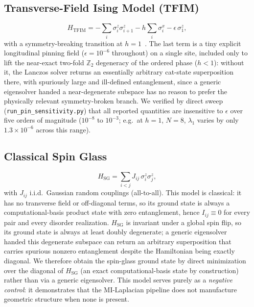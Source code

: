 \documentclass[aps,prx,reprint,amsmath,amssymb,superscriptaddress]{revtex4-2}
\begin{document}
\subsection{Transverse-Field Ising Model (TFIM)}
\begin{equation}
H_{\mathrm{TFIM}} = -\sum_{i} \sigma_i^z \sigma_{i+1}^z - h \sum_{i} \sigma_i^x - \epsilon\, \sigma_1^z,
\end{equation}
with a symmetry-breaking transition at $h=1$~\cite{Pfeuty1970}. The last term is a tiny explicit longitudinal pinning
field ($\epsilon=10^{-6}$ throughout) on a single site, included only to lift the near-exact
two-fold $\mathbb{Z}_2$ degeneracy of the ordered phase ($h<1$): without it, the Lanczos solver
returns an essentially arbitrary cat-state superposition there, with spuriously large and
ill-defined entanglement, since a generic eigensolver handed a near-degenerate subspace has no
reason to prefer the physically relevant symmetry-broken branch. We verified by direct sweep
(\texttt{run\_pin\_sensitivity.py}) that all reported quantities are insensitive to $\epsilon$ over
five orders of magnitude ($10^{-8}$ to $10^{-3}$; e.g.\ at $h=1$, $N=8$, $\lambda_1$ varies by only
$1.3\times10^{-6}$ across this range).

\subsection{Classical Spin Glass}
\begin{equation}
H_{\mathrm{SG}} = \sum_{i<j} J_{ij}\, \sigma_i^z \sigma_j^z,
\end{equation}
with $J_{ij}$ i.i.d.\ Gaussian random couplings (all-to-all). This model is classical: it has no
transverse field or off-diagonal terms, so its ground state is always a computational-basis product
state with zero entanglement, hence $I_{ij}\equiv 0$ for every pair and every disorder realization.
$H_{\mathrm{SG}}$ is invariant under a global spin flip, so its ground state is always at least
doubly degenerate; a generic eigensolver handed this degenerate subspace can return an arbitrary
superposition that carries spurious nonzero entanglement despite the Hamiltonian being exactly
diagonal. We therefore obtain the spin-glass ground state by direct minimization over the diagonal
of $H_{\mathrm{SG}}$ (an exact computational-basis state by construction) rather than via a generic
eigensolver. This model serves purely as a \emph{negative control}: it demonstrates that the
MI-Laplacian pipeline does not manufacture geometric structure when none is present.
\end{document}
